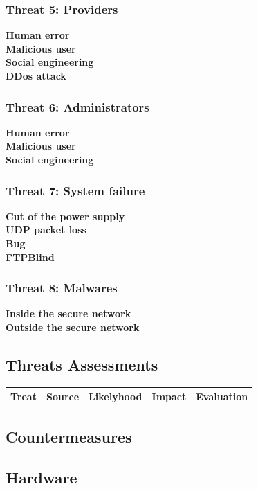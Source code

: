 \documentclass[a4paper,11pt]{article}
\begin{document}
\subsubsection{Threat 5: Providers}
\textbf{Human error}\\
\textbf{Malicious user}\\
\textbf{Social engineering}\\
\textbf{DDos attack}\\
\subsubsection{Threat 6: Administrators}
\textbf{Human error}\\
\textbf{Malicious user}\\
\textbf{Social engineering}\\
\subsubsection{Threat 7: System failure}
\textbf{Cut of the power supply}\\
\textbf{UDP packet loss}\\
\textbf{Bug}\\
\textbf{FTPBlind}\\
\subsubsection{Threat 8: Malwares}
\textbf{Inside the secure network}\\
\textbf{Outside the secure network}\\

\subsection{Threats Assessments}
\begin{tabular}{|c|c|c|c|c|}
\hline
Treat & Source & Likelyhood & Impact & Evaluation \\
\hline

\end{tabular}
\subsection{Countermeasures}




\subsection{Hardware}
\end{document}
